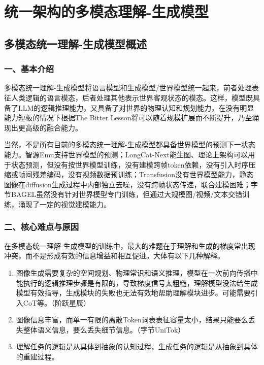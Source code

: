 \hypertarget{ux7edfux4e00ux67b6ux6784ux7684ux591aux6a21ux6001ux7406ux89e3-ux751fux6210ux6a21ux578b}{%
\chapter{统一架构的多模态理解-生成模型}\label{ux7edfux4e00ux67b6ux6784ux7684ux591aux6a21ux6001ux7406ux89e3-ux751fux6210ux6a21ux578b}}

\hypertarget{ux591aux6a21ux6001ux7edfux4e00ux7406ux89e3-ux751fux6210ux6a21ux578bux6982ux8ff0}{%
\section{多模态统一理解-生成模型概述}\label{ux591aux6a21ux6001ux7edfux4e00ux7406ux89e3-ux751fux6210ux6a21ux578bux6982ux8ff0}}

\hypertarget{ux4e00ux57faux672cux4ecbux7ecd}{%
\subsection{一、基本介绍}\label{ux4e00ux57faux672cux4ecbux7ecd}}

多模态统一理解-生成模型将语言模型和生成模型/世界模型统一起来，前者处理表征人类逻辑的语言模态，后者处理其他表示世界客观状态的模态。这样，模型既具备了LLM的逻辑推理能力，又具备了对世界的物理认知和规划能力，在没有明显能力短板的情况下根据The Bitter Lesson将可以随着规模扩展而不断提升，乃至涌现出更高级的融合能力。

当然，不是所有目前的多模态统一理解-生成模型都具备世界模型的预测下一状态能力。智源Emu支持世界模型的预测；LongCat-Next能生图、理论上架构可以用于状态预测，但没有按世界模型训练，没有建模跨帧token依赖，没有引入时序压缩或帧间残差编码，没有视频数据预训练；Transfusion没有世界模型能力，静态图像在diffusion生成过程中内部独立去噪，没有跨帧状态传递，联合建模困难；字节BAGEL虽然没有针对世界模型专门训练，但通过大规模图/视频/文本交错训练，涌现了一定的视觉建模能力。

\hypertarget{ux4e8cux6838ux5fc3ux96beux70b9ux4e0eux539fux56e0}{%
\subsection{二、核心难点与原因}\label{ux4e8cux6838ux5fc3ux96beux70b9ux4e0eux539fux56e0}}

在多模态统一理解-生成模型的训练中，最大的难题在于理解和生成的梯度常出现冲突，而不是形成有效的信息增益和相互促进。大体有以下几种解释。

\begin{enumerate}
\def\labelenumi{\arabic{enumi}.}
\item
  图像生成需要复杂的空间规划、物理常识和语义推理，模型在一次前向传播中能执行的逻辑推理步骤是有限的，导致梯度信号太粗糙，理解模型没法给生成模型有效指导，生成模块的失败也无法有效地帮助理解模块进步。可能需要引入CoT等。（阶跃星辰）
\item
  图像信息丰富，而单一有限的离散Token词表表征容量太小，结果只能要么丢失整体语义信息，要么丢失细节信息。（字节UniTok）
\item
  理解任务的逻辑是从具体到抽象的认知过程，生成任务的逻辑是从抽象到具体的重建过程。
\end{enumerate}

